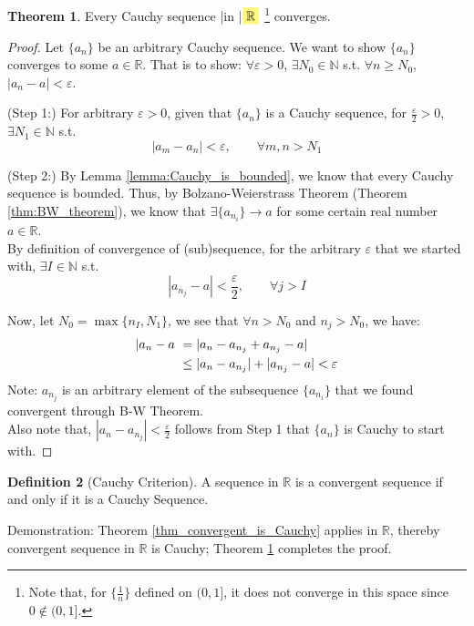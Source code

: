 \documentclass[12pt]{article}
\newcommand{\N}{{\mathbb N}}
\newcommand{\R}{{\mathbb R}}
\theoremstyle{definition}
\newtheorem{theorem}{Theorem}[section]
\newtheorem{definition}[theorem]{Definition}
\theoremstyle{plain}
\newcommand{\highlight}[1]{%
 \colorbox{yellow!50}{$\displaystyle#1$}}
\begin{document}
\begin{theorem}
    \label{thm:Cauchy_convergent_in_R}
    Every Cauchy sequence \yverb|in |$\highlight{\R}$
    \footnote{Note that, for $\{\frac{1}{n}\}$ defined on $(0,1]$, it does not
    converge in this space since $0\not\in (0,1]$.}
    converges.
    \begin{proof} Let $\{a_n\}$ be an arbitrary Cauchy sequence.
        We want to show $\{a_n \}$ converges to some $a \in \R$. That is to
        show: $\forall \varepsilon > 0$, $\exists N_0 \in \N$ s.t. $\forall n
        \ge N_0$, $|a_n - a| < \varepsilon$.

        (Step 1:) For arbitrary $\varepsilon > 0$, given that $\{a_n \}$ is a Cauchy
        sequence, for $\frac{\varepsilon}{2} > 0$, $\exists N_1 \in \N$ s.t.
        \[
            |a_m - a_n| < \varepsilon, \qquad \forall m, n > N_1
        \]

        (Step 2:) By Lemma \ref{lemma:Cauchy_is_bounded}, we know that every Cauchy
        sequence is bounded.
        Thus, by Bolzano-Weierstrass Theorem (Theorem \ref{thm:BW_theorem}), we
        know that $\exists \{a_{n_i}\} \to a$ for some certain real number $a
        \in \R$.  \\ By definition of
        convergence of (sub)sequence, for the arbitrary $\varepsilon$ that we
        started with, $\exists I \in \N$ s.t.
        \[
            |a_{n_j} - a | < \frac{\varepsilon}{2}, \qquad \forall j > I
        \]

        Now, let $N_0 = \max \{ n_I, N_1\}$, we see that $\forall n > N_0$ and
        $n_j > N_0$, we have:
        \[
            \aligned
            |a_n - a \ & = | a_n - a_{n_j} + a_{n_j} - a | \\
                       & \le |a_n - a_{n_j}| + |a_{n_j} - a| < \varepsilon
           \endaligned
        \]
        Note: $a_{n_j}$ is an arbitrary element of the subsequence $\{a_{n_i}\}$
        that we found convergent through B-W Theorem.\\
        Also note that, $|a_n - a_{n_j}| < \frac{\varepsilon}{2}$ follows from
        Step 1 that $\{a_n\}$ is Cauchy to start with.
    \end{proof}
\end{theorem}

\begin{definition}
    [Cauchy Criterion]
    A sequence in $\R$ is a convergent sequence if and only if it is a Cauchy
    Sequence.

    Demonstration:
    Theorem \ref{thm_convergent_is_Cauchy} applies in $\R$, thereby convergent
    sequence in $\R$ is Cauchy; Theorem \ref{thm:Cauchy_convergent_in_R}
    completes the proof.
\end{definition}
\end{document}
